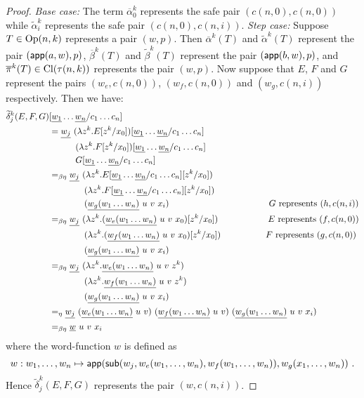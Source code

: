 \begin{proof}
\emph{Base case:} The term $\overline\alpha_0^k$ represents the safe pair $(c(n,0),c(n,0))$ while
$\widetilde\alpha_i^k$ represents the safe pair
$(c(n,0),c(n,i))$. \emph{Step case:} Suppose $T\in
{\rm Op}(n,k)$ represents
 a pair $(w,p)$.  Then $\overline\alpha^k(T)$ and
 $\widetilde\alpha^k(T)$ represent the pair
 $({\sf app}(a,w),p)$, $\overline\beta^k(T)$ and
 $\widetilde\beta^k(T)$ represent the pair
 $({\sf app}(b,w),p)$, and $\overline\pi^k(T) \in {\rm Cl}(\tau(n,k))$ represents the pair $(w,p)$. Now suppose that $E$, $F$ and $G$ represent the pairs
 $(w_e,c(n,0))$, $(w_f,c(n,0))$ and $(w_g,c(n,i))$ respectively.
 Then we have:
 \begin{alignat*}{2}
   \widetilde \delta^k_j (E,F,G) &[\zaioncencode{w_1}\ldots \zaioncencode{w_n}/c_1\ldots c_n] \\
   &= \zaioncencode{w_j}\  (\lambda z^k. E[z^k/x_0])[\zaioncencode{w_1}\ldots \zaioncencode{w_n}/c_1\ldots c_n] \\
       & \qquad\quad (\lambda z^k. F[z^k/x_0])[\zaioncencode{w_1}\ldots \zaioncencode{w_n}/c_1\ldots c_n] \\
       & \qquad\quad  G[\zaioncencode{w_1}\ldots \zaioncencode{w_n}/c_1\ldots c_n] \\
   &=_{\beta\eta} \zaioncencode{w_j}\  (\lambda z^k. E[\zaioncencode{w_1}\ldots \zaioncencode{w_n}/c_1\ldots c_n][z^k/x_0]) \\
       & \qquad\qquad (\lambda z^k. F[\zaioncencode{w_1}\ldots \zaioncencode{w_n}/c_1\ldots c_n][z^k/x_0]) \\
       & \qquad\qquad  (\zaioncencode{w_g(w_1\ldots w_n)}~u~v~x_i) \hspace{4cm}\mbox{$G$ represents $(h,c(n,i))$}\\
   &=_{\beta\eta} \zaioncencode{w_j}\  (\lambda z^k. (\zaioncencode{w_e(w_1\ldots w_n)}~u~v~x_0)[z^k/x_0]) \hspace{2cm}\mbox{$E$ represents $(f,c(n,0))$} \\
       & \qquad\qquad (\lambda z^k. (\zaioncencode{w_f(w_1\ldots w_n)}~u~v~x_0)[z^k/x_0]) \hspace{1.8cm}\mbox{$F$ represents $(g,c(n,0))$} \\
       & \qquad\qquad  (\zaioncencode{w_g(w_1\ldots w_n)}~u~v~x_i)\\
%
   &=_{\beta\eta} \zaioncencode{w_j}\  (\lambda z^k. \zaioncencode{w_e(w_1\ldots w_n)}~u~v~z^k) \\
       & \qquad\qquad (\lambda z^k. \zaioncencode{w_f(w_1\ldots w_n)}~u~v~z^k) \\
       & \qquad\qquad (\zaioncencode{w_g(w_1\ldots w_n)}~u~v~x_i)\\
%
   &=_\eta \zaioncencode{w_j}\  (\zaioncencode{w_e(w_1\ldots w_n)}~u~v)  \ (\zaioncencode{w_f(w_1\ldots w_n)}~u~v) \  (\zaioncencode{w_g(w_1\ldots w_n)}~u~v~x_i)\\
%
   &=_{\beta\eta}  \zaioncencode{w}~u~v~ x_i
 \end{alignat*}
where the word-function $w$ is defined as
$$w: w_1,\ldots,w_n \mapsto {\sf app}({\sf sub}(w_j,w_e(w_1,\ldots,w_n),w_f(w_1,\ldots,w_n)),w_g(x_1,\ldots,w_n)) \ .$$
  Hence $\widetilde \delta^k_j (E,F,G)$ represents the pair $(w,c(n,i))$.


\end{proof}
